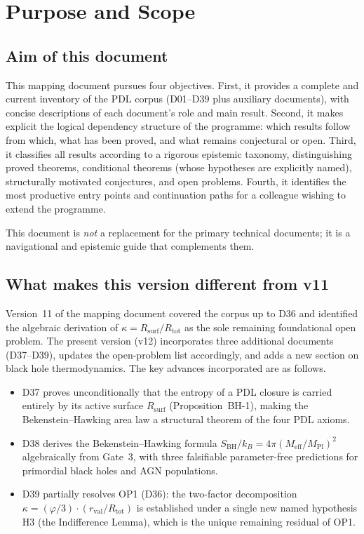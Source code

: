 \documentclass[11pt,a4paper]{article}
\theoremstyle{plain}
\theoremstyle{definition}
\theoremstyle{remark}
\newcommand{\rval}{r_{\mathrm{val}}}
\newcommand{\Rsurf}{R_{\mathrm{surf}}}
\newcommand{\Rtot}{R_{\mathrm{tot}}}
\newcommand{\SBH}{S_{\mathrm{BH}}}
\newcommand{\Meff}{M_{\mathrm{eff}}}
\newcommand{\MPl}{M_{\mathrm{Pl}}}
\begin{document}
\section{Purpose and Scope}
\label{sec:purpose}

\subsection{Aim of this document}
\label{subsec:aim}

This mapping document pursues four objectives.
First, it provides a complete and current inventory of the PDL corpus (D01--D39 plus auxiliary documents), with concise descriptions of each document's role and main result.
Second, it makes explicit the logical dependency structure of the programme: which results follow from which, what has been proved, and what remains conjectural or open.
Third, it classifies all results according to a rigorous epistemic taxonomy, distinguishing proved theorems, conditional theorems (whose hypotheses are explicitly named), structurally motivated conjectures, and open problems.
Fourth, it identifies the most productive entry points and continuation paths for a colleague wishing to extend the programme.

This document is \emph{not} a replacement for the primary technical documents; it is a navigational and epistemic guide that complements them.

\subsection{What makes this version different from v11}
\label{subsec:diff_v11}

Version~11 of the mapping document covered the corpus up to D36 and identified the algebraic derivation of $\kappa = \Rsurf/\Rtot$ as the sole remaining foundational open problem.
The present version (v12) incorporates three additional documents (D37--D39), updates the open-problem list accordingly, and adds a new section on black hole thermodynamics.
The key advances incorporated are as follows.

\begin{itemize}
\item D37 proves unconditionally that the entropy of a PDL closure is carried entirely by its active surface $\Rsurf$ (Proposition~BH-1), making the Bekenstein--Hawking area law a structural theorem of the four PDL axioms.
\item D38 derives the Bekenstein--Hawking formula $\SBH/k_B = 4\pi(\Meff/\MPl)^2$ algebraically from Gate~3, with three falsifiable parameter-free predictions for primordial black holes and AGN populations.
\item D39 partially resolves OP1 (D36): the two-factor decomposition $\kappa = (\varphi/3)\cdot(\rval/\Rtot)$ is established under a single new named hypothesis H3 (the Indifference Lemma), which is the unique remaining residual of OP1.
\end{itemize}
\end{document}
